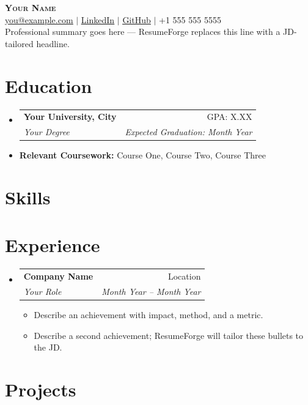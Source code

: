 \documentclass[letterpaper,10pt]{article}
\makeatletter
\newcommand{\resumeItem}[1]{
  \item{\small\setlength{\baselineskip}{10pt} #1 \vspace{-2pt}}
}
\newcommand{\resumeSubheading}[4]{
  \vspace{-2pt}\item
    \begin{tabular*}{\textwidth}[t]{@{}p{0.75\textwidth}@{\extracolsep{\fill}}r@{}}
      \textbf{#1} & \small #2 \\
      \textit{\small#3} & \textit{\small #4} \\
    \end{tabular*}\vspace{-4pt}
}
\newcommand{\resumeProjectHeading}[2]{
    \item
    \begin{tabular*}{\textwidth}{@{}l@{\extracolsep{\fill}}r@{}}
      \small#1 & \small\textit{#2} \\
    \end{tabular*}\vspace{-4pt}
}
\newcommand{\resumeSubHeadingListStart}{\begin{itemize}[leftmargin=0in, label={}, topsep=0pt, partopsep=0pt]}
\newcommand{\resumeSubHeadingListEnd}{\end{itemize}}
\newcommand{\resumeItemListStart}{\begin{itemize}[leftmargin=0.15in, label={$\bullet$}, topsep=0pt, partopsep=0pt, itemsep=3pt, parsep=0pt]}
\newcommand{\resumeItemListEnd}{\end{itemize}}
\makeatother
\begin{document}
\fontsize{10.5}{11}\selectfont
\begin{center}
    {\Huge \scshape \textbf{Your Name}} \\ \vspace{4pt}
    \href{mailto:you@example.com}{\ul{you@example.com}} $|$
    \href{https://www.linkedin.com/in/your-handle/}{\ul{LinkedIn}} $|$
    \href{https://github.com/your-handle}{\ul{GitHub}} $|$
    +1 555 555 5555 \\ \vspace{6pt}
    {Professional summary goes here — ResumeForge replaces this line with a JD-tailored headline.}
\end{center}
\section{Education}
\resumeSubHeadingListStart
  \resumeSubheading
    {Your University, City}{GPA: X.XX}
    {Your Degree}{\textit{Expected Graduation: Month Year}}  \vspace{-9pt}
  \item \small{\textbf{Relevant Coursework:} Course One, Course Two, Course Three}
\resumeSubHeadingListEnd
\section{Skills}
\begin{itemize}[leftmargin=0in, label={}, topsep=0pt, partopsep=0pt]
  \small{\item{
  }}
\end{itemize}
\section{Experience}
\resumeSubHeadingListStart
  \resumeSubheading
    {Company Name}{Location}
    {Your Role}{Month Year -- Month Year}
    \resumeItemListStart
      \resumeItem{Describe an achievement with impact, method, and a metric.}
      \resumeItem{Describe a second achievement; ResumeForge will tailor these bullets to the JD.}
    \resumeItemListEnd
\resumeSubHeadingListEnd
\section{Projects}
\resumeSubHeadingListStart
\resumeSubHeadingListEnd
\end{document}
